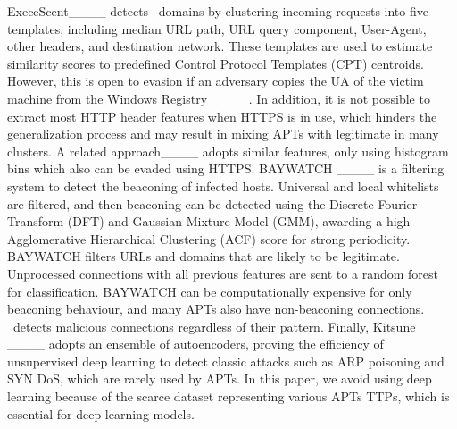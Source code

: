 ExeceScent____ detects \cc\ domains by clustering incoming requests into five templates, including median URL path, URL query component, User-Agent, other headers, and destination network. 
%
These templates are used to estimate similarity scores to predefined Control Protocol Templates (CPT) centroids. 
%
However, this is open to evasion if an adversary copies the UA of the victim machine from the Windows Registry ____. 
%
In addition, it is not possible to extract most HTTP header features when HTTPS is in use, which hinders the generalization process and may result in mixing APTs with legitimate in many clusters. 
%
A related approach____ adopts similar features, only using histogram bins which also can be evaded using HTTPS. 
%
%
BAYWATCH ____ is a filtering system to detect the beaconing of infected hosts. 
%
Universal and local whitelists are filtered, and then beaconing can be detected using the Discrete Fourier Transform (DFT) and Gaussian Mixture Model (GMM), awarding a high Agglomerative Hierarchical Clustering (ACF) score for strong periodicity.
%
BAYWATCH filters URLs and domains that are likely to be legitimate. 
%
Unprocessed connections with all previous features are sent to a random forest for classification.
%
BAYWATCH can be computationally expensive for only beaconing behaviour, and many APTs also have non-beaconing connections. 
%
\earlycrow\ detects malicious connections regardless of their pattern.
%
Finally, Kitsune ____ adopts an ensemble of autoencoders, proving the efficiency of unsupervised deep learning to detect classic attacks such as ARP poisoning and SYN DoS, which are rarely used by APTs. 
%
In this paper, we avoid using deep learning because of the scarce dataset representing various APTs TTPs, which is essential for deep learning models. 


